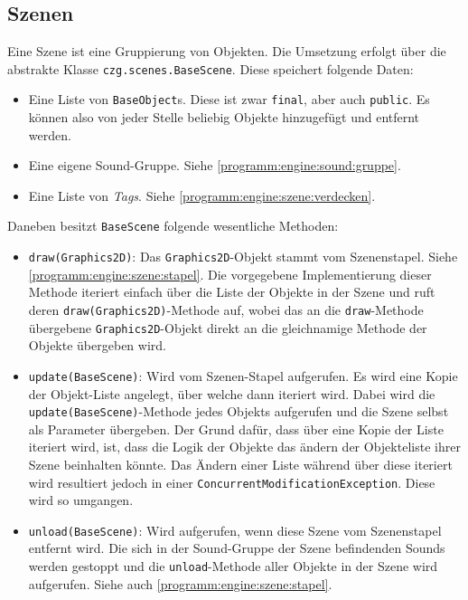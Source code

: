 \begin{sloppypar}
\subsection{Szenen}

Eine Szene ist eine Gruppierung von Objekten. Die Umsetzung erfolgt
über die abstrakte Klasse \texttt{czg.scenes.BaseScene}. Diese speichert
folgende Daten:

\begin{itemize}
	\item Eine Liste von \texttt{BaseObject}s. Diese ist zwar \texttt{final},
	      aber auch \texttt{public}. Es können also von jeder Stelle beliebig
	      Objekte hinzugefügt und entfernt werden.
	\item Eine eigene Sound-Gruppe. Siehe \ref{programm:engine:sound:gruppe}.
	\item Eine Liste von \textit{Tags}. Siehe \ref{programm:engine:szene:verdecken}.
\end{itemize}

Daneben besitzt \texttt{BaseScene} folgende wesentliche Methoden:

\begin{itemize}
	\item \texttt{draw(Graphics2D)}: Das \texttt{Graphics2D}-Objekt
	      stammt vom Szenenstapel. Siehe \ref{programm:engine:szene:stapel}.
	      Die vorgegebene Implementierung dieser Methode iteriert
	      einfach über die Liste der Objekte in der Szene und ruft deren
	      \texttt{draw(Graphics2D)}-Methode auf, wobei das an die
	      \texttt{draw}-Methode übergebene \texttt{Graphics2D}-Objekt
	      direkt an die gleichnamige Methode der Objekte übergeben wird.
	\item \texttt{update(BaseScene)}: Wird vom Szenen-Stapel aufgerufen.
		  Es wird eine Kopie der Objekt-Liste angelegt, über welche dann
		  iteriert wird. Dabei wird die \texttt{update(BaseScene)}-Methode
		  jedes Objekts aufgerufen und die Szene selbst als Parameter
		  übergeben. Der Grund dafür, dass über eine Kopie der Liste
		  iteriert wird, ist, dass die Logik der Objekte das ändern
		  der Objekteliste ihrer Szene beinhalten könnte. Das Ändern
		  einer Liste während über diese iteriert wird resultiert
		  jedoch in einer \texttt{ConcurrentModificationException}.
		  Diese wird so umgangen.
	\item \texttt{unload(BaseScene)}: Wird aufgerufen, wenn diese
	      Szene vom Szenenstapel entfernt wird. Die sich in der Sound-Gruppe
	      der Szene befindenden Sounds werden gestoppt und die
	      \texttt{unload}-Methode aller Objekte in der Szene
	      wird aufgerufen.
	      Siehe auch \ref{programm:engine:szene:stapel}.
\end{itemize}


\end{sloppypar}
